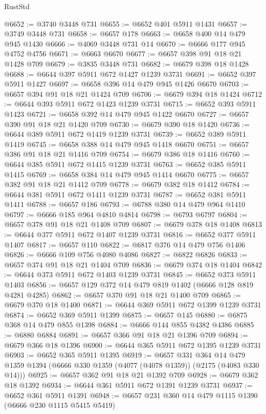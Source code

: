 \begin{lexlean}{RustStd}
\begin{coremodule}
@6652 := @3740 @3448 @731
@6655 := @6652 @401 @5911 @1431
@6657 := @3749 @3448 @731
@6658 := @6657 @178
@6663 := @6658 @400 @14 @479 @945 @1430
@6666 := @4069 @3448 @731 @14
@6670 := @6666 @177 @945 @4752 @4756
@6671 := @6663 @6670
@6677 := @6657 @398 @91 @18 @21 @1428 @709
@6679 := @3835 @3448 @731
@6682 := @6679 @398 @18 @1428
@6688 := @6644 @397 @5911 @672 @1427 @1239 @3731
@6691 := @6652 @397 @5911 @1427
@6697 := @6658 @396 @14 @479 @945 @1426 @6670
@6703 := @6657 @394 @91 @18 @21 @1424 @709
@6706 := @6679 @394 @18 @1424
@6712 := @6644 @393 @5911 @672 @1423 @1239 @3731
@6715 := @6652 @393 @5911 @1423
@6721 := @6658 @392 @14 @479 @945 @1422 @6670
@6727 := @6657 @390 @91 @18 @21 @1420 @709
@6730 := @6679 @390 @18 @1420
@6736 := @6644 @389 @5911 @672 @1419 @1239 @3731
@6739 := @6652 @389 @5911 @1419
@6745 := @6658 @388 @14 @479 @945 @1418 @6670
@6751 := @6657 @386 @91 @18 @21 @1416 @709
@6754 := @6679 @386 @18 @1416
@6760 := @6644 @385 @5911 @672 @1415 @1239 @3731
@6763 := @6652 @385 @5911 @1415
@6769 := @6658 @384 @14 @479 @945 @1414 @6670
@6775 := @6657 @382 @91 @18 @21 @1412 @709
@6778 := @6679 @382 @18 @1412
@6784 := @6644 @381 @5911 @672 @1411 @1239 @3731
@6787 := @6652 @381 @5911 @1411
@6788 := @6657 @186
@6793 := @6788 @380 @14 @479 @964 @1410
@6797 := @6666 @185 @964 @4810 @4814
@6798 := @6793 @6797
@6804 := @6657 @378 @91 @18 @21 @1408 @709
@6807 := @6679 @378 @18 @1408
@6813 := @6644 @377 @5911 @672 @1407 @1239 @3731
@6816 := @6652 @377 @5911 @1407
@6817 := @6657 @110
@6822 := @6817 @376 @14 @479 @756 @1406
@6826 := @6666 @109 @756 @4080 @4086
@6827 := @6822 @6826
@6833 := @6657 @374 @91 @18 @21 @1404 @709
@6836 := @6679 @374 @18 @1404
@6842 := @6644 @373 @5911 @672 @1403 @1239 @3731
@6845 := @6652 @373 @5911 @1403
@6856 := @6657 @129 @372 @14 @479 @819 @1402 (@6666 @128 @819 @4281 @4285)
@6862 := @6657 @370 @91 @18 @21 @1400 @709
@6865 := @6679 @370 @18 @1400
@6871 := @6644 @369 @5911 @672 @1399 @1239 @3731
@6874 := @6652 @369 @5911 @1399
@6875 := @6657 @145
@6880 := @6875 @368 @14 @479 @855 @1398
@6884 := @6666 @144 @855 @4382 @4386
@6885 := @6880 @6884
@6891 := @6657 @366 @91 @18 @21 @1396 @709
@6894 := @6679 @366 @18 @1396
@6900 := @6644 @365 @5911 @672 @1395 @1239 @3731
@6903 := @6652 @365 @5911 @1395
@6919 := @6657
    @331
    @364
    @14
    @479
    @1359
    @1394
    (@6666 @330 @1359 (@4077 (@4078 @1359)) (@2175 (@4083 @330 @14)))
@6925 := @6657 @362 @91 @18 @21 @1392 @709
@6928 := @6679 @362 @18 @1392
@6934 := @6644 @361 @5911 @672 @1391 @1239 @3731
@6937 := @6652 @361 @5911 @1391
@6948 := @6657 @231 @360 @14 @479 @1115 @1390 (@6666 @230 @1115 @5415 @5419)

\end{coremodule}
\end{lexlean}
